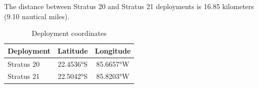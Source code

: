 
The distance between Stratus 20 and Stratus 21 deployments is 16.85 kilometers (9.10 nautical miles).

\begin{table}[ht]
\centering
\caption{Deployment coordinates}
\begin{tabular}{lcc}
\hline
\textbf{Deployment} & \textbf{Latitude} & \textbf{Longitude} \\
\hline
Stratus 20 & 22.4536°S & 85.6657°W \\
Stratus 21 & 22.5042°S & 85.8203°W \\
\hline
\end{tabular}
\end{table}
